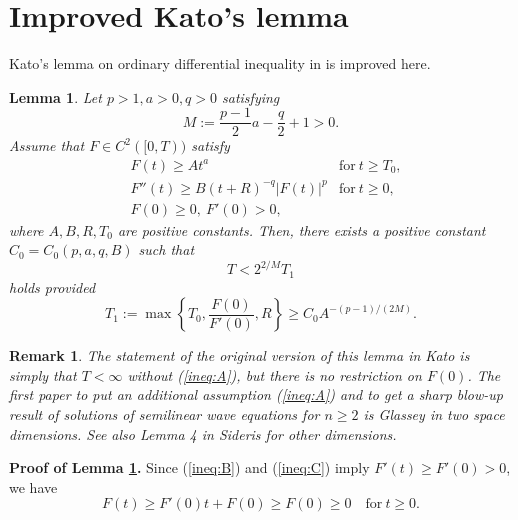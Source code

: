 \documentclass[a4paper,12pt]{article}
\numberwithin{equation}{section}
\newtheorem{lem}{Lemma}[section]
\newtheorem{rem}{Remark}[section]
\begin{document}

\section{Improved Kato's lemma}
\label{section:ODI}
\par
Kato's lemma on ordinary differential inequality in \cite{Kato80} is improved here. 
\begin{lem}
\label{lem:improvedKato1}
Let $p>1, a>0, q>0$ satisfying
\begin{equation}
\label{subcriticalexponent}
M:=\frac{p-1}{2}a-\frac{q}{2}+1>0.
\end{equation}
Assume that $F\in C^2([0,T))$ satisfy
\begin{eqnarray}
& F(t)\ge  At^a &  \mbox{for}\ t\ge T_0,\label{ineq:A}\\
& F''(t)\ge  B(t+R)^{-q}|F(t)|^p & \mbox{for}\ t\ge0,\label{ineq:B}\\
& F(0)\ge0,\ F'(0)>0,\label{ineq:C}&
\end{eqnarray}
where $A,B,R,T_0$ are positive constants.
Then, there exists a positive constant $C_0=C_0(p,a,q,B)$ such that
\begin{equation}
\label{est:T_1}
T<2^{2/M}T_1
\end{equation}
holds provided
\begin{equation}
\label{condi}
T_1:=\max\left\{T_0,\frac{F(0)}{F'(0)},R\right\}\ge C_0 A^{-(p-1)/(2M)}.
\end{equation}
\end{lem}
\begin{rem}
\label{rem:Kato1}
The statement of the original version of this lemma in Kato \cite{Kato80}
is simply that $T<\infty$ without (\ref{ineq:A}),
but there is no restriction on $F(0)$.
The first paper to put an additional assumption (\ref{ineq:A})
and to get a sharp blow-up result of solutions of semilinear wave equations for $n\ge2$
is Glassey \cite{G81a} in two space dimensions.
See also Lemma 4 in Sideris \cite{Si84} for other dimensions.
\end{rem}
\par\noindent
{\bf Proof of Lemma \ref{lem:improvedKato1}.}
Since (\ref{ineq:B}) and (\ref{ineq:C}) imply $F'(t)\ge F'(0)>0$, we have
\begin{equation}
\label{bound:F1}
F(t)\ge F'(0)t+F(0)\ge F(0)\ge0\quad\mbox{for}\ t\ge0.
\end{equation}
\end{document}
